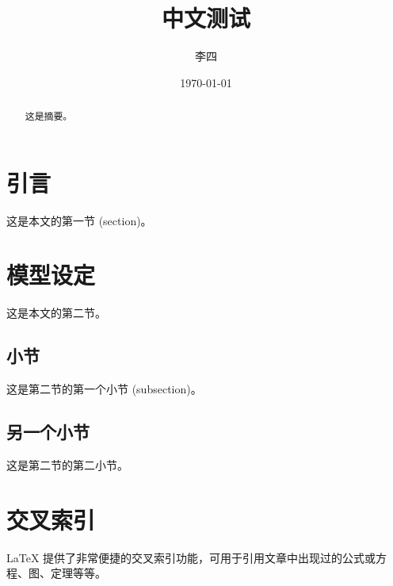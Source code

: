 \documentclass[12pt]{ctexart}
\title{中文测试}
\author{李四}
\date{\today}
\begin{document}
\maketitle

\begin{abstract}

这是摘要。

\end{abstract}

\section{引言}

这是本文的第一节 (section)。

\section{模型设定}

这是本文的第二节。

\subsection{小节}

这是第二节的第一个小节 (subsection)。

\subsection{另一个小节}

这是第二节的第二小节。

\section{交叉索引}

\LaTeX{} 提供了非常便捷的交叉索引功能，可用于引用文章中出现过的公式或方程、图、定理等等。
\end{document}
